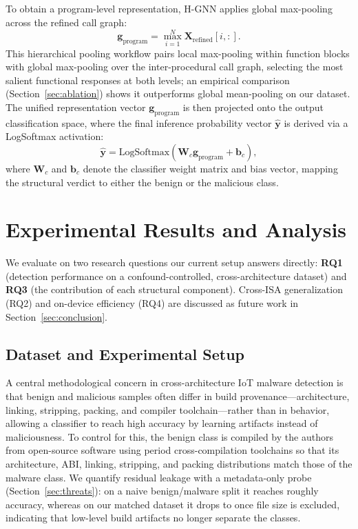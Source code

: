 \documentclass[conference]{IEEEtran}
\begin{document}
To obtain a program-level representation, H-GNN applies global max-pooling across the refined call graph:
\begin{equation}
\mathbf{g}_{\text{program}} = \operatorname*{max}_{i=1}^{N} \mathbf{X}_{\text{refined}}[i, :].
\end{equation}
This hierarchical pooling workflow pairs local max-pooling within function blocks with global max-pooling over the inter-procedural call graph, selecting the most salient functional responses at both levels; an empirical comparison (Section~\ref{sec:ablation}) shows it outperforms global mean-pooling on our dataset. The unified representation vector $\mathbf{g}_{\text{program}}$ is then projected onto the output classification space, where the final inference probability vector $\hat{\mathbf{y}}$ is derived via a LogSoftmax activation:
\begin{equation}
\hat{\mathbf{y}} = \mathrm{LogSoftmax}\left(\mathbf{W}_{c} \mathbf{g}_{\text{program}} + \mathbf{b}_{c}\right),
\end{equation}
where $\mathbf{W}_{c}$ and $\mathbf{b}_{c}$ denote the classifier weight matrix and bias vector, mapping the structural verdict to either the benign or the malicious class.

\section{Experimental Results and Analysis}
\label{sec:experiments}

We evaluate  on two research questions our current setup
answers directly: \textbf{RQ1} (detection performance on a
confound-controlled, cross-architecture dataset) and \textbf{RQ3} (the
contribution of each structural component). Cross-ISA generalization
(RQ2) and on-device efficiency (RQ4) are discussed as future work in
Section~\ref{sec:conclusion}.

\subsection{Dataset and Experimental Setup}
\label{sec:setup}

A central methodological concern in cross-architecture IoT malware
detection is that benign and malicious samples often differ in build
provenance—architecture, linking, stripping, packing, and compiler
toolchain—rather than in behavior, allowing a classifier to reach high
accuracy by learning artifacts instead of maliciousness. To control for
this, the benign class is compiled by the authors from open-source software using period cross-compilation toolchains so that its
architecture, ABI, linking, stripping, and packing distributions match
those of the malware class. We quantify residual leakage with a metadata-only
probe (Section~\ref{sec:threats}): on a naive benign/malware split it
reaches roughly \probeOld{} accuracy, whereas on our matched dataset it
drops to \probeNew{} once file size is excluded, indicating that low-level
build artifacts no longer separate the classes.
\end{document}
